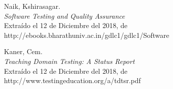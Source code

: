 \begin{thebibliography}{99}
 Naik, Kshirasagar.\\
\emph{Software Testing and Quality Assurance}\\
Extraído el 12 de Diciembre del 2018, de\\
http://ebooks.bharathuniv.ac.in/gdlc1/gdlc1/Software%

 Kaner, Cem.\\
\emph{Teaching Domain Testing: A Status Report}\\
Extraído el 12 de Diciembre del 2018, de\\
http://www.testingeducation.org/a/tdtsr.pdf

\end{thebibliography}

